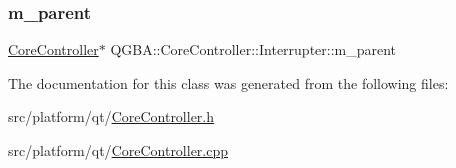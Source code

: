 \subsubsection{\texorpdfstring{m\+\_\+parent}{m\_parent}}
{\footnotesize\ttfamily \mbox{\hyperlink{class_q_g_b_a_1_1_core_controller}{Core\+Controller}}$\ast$ Q\+G\+B\+A\+::\+Core\+Controller\+::\+Interrupter\+::m\+\_\+parent\hspace{0.3cm}{\ttfamily [private]}}



The documentation for this class was generated from the following files\+:\begin{DoxyCompactItemize}
\item 
src/platform/qt/\mbox{\hyperlink{_core_controller_8h}{Core\+Controller.\+h}}\item 
src/platform/qt/\mbox{\hyperlink{_core_controller_8cpp}{Core\+Controller.\+cpp}}\end{DoxyCompactItemize}

